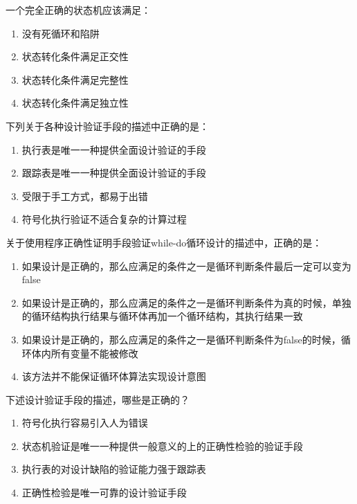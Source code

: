 \begin{problem}
	一个完全正确的状态机应该满足：
    \vspace{-0.8em}
    \begin{multicols}{2}
        \begin{enumerate}[label=\Alph*.]
            \item 没有死循环和陷阱
            \item 状态转化条件满足正交性
            \item 状态转化条件满足完整性
            \item 状态转化条件满足独立性
        \end{enumerate}
    \end{multicols}
    \vspace{-1em}
\end{problem}




\begin{problem}
	下列关于各种设计验证手段的描述中正确的是：
    \vspace{-0.8em}
    \begin{multicols}{2}
        \begin{enumerate}[label=\Alph*.]
            \item 执行表是唯一一种提供全面设计验证的手段
            \item 跟踪表是唯一一种提供全面设计验证的手段
            \item 受限于手工方式，都易于出错
            \item 符号化执行验证不适合复杂的计算过程
        \end{enumerate}
    \end{multicols}
    \vspace{-1em}
\end{problem}



\begin{problem}
	关于使用程序正确性证明手段验证while-do循环设计的描述中，正确的是：
        \begin{enumerate}[label=\Alph*.]
            \item 如果设计是正确的，那么应满足的条件之一是循环判断条件最后一定可以变为false
            \item 如果设计是正确的，那么应满足的条件之一是循环判断条件为真的时候，单独的循环结构执行结果与循环体再加一个循环结构，其执行结果一致
            \item 如果设计是正确的，那么应满足的条件之一是循环判断条件为false的时候，循环体内所有变量不能被修改
            \item 该方法并不能保证循环体算法实现设计意图
        \end{enumerate}
\end{problem}



\begin{problem}
	下述设计验证手段的描述，哪些是正确的？
        \begin{enumerate}[label=\Alph*.]
            \item 符号化执行容易引入人为错误
            \item 状态机验证是唯一一种提供一般意义的上的正确性检验的验证手段
            \item 执行表的对设计缺陷的验证能力强于跟踪表
            \item 正确性检验是唯一可靠的设计验证手段
        \end{enumerate}
\end{problem}
